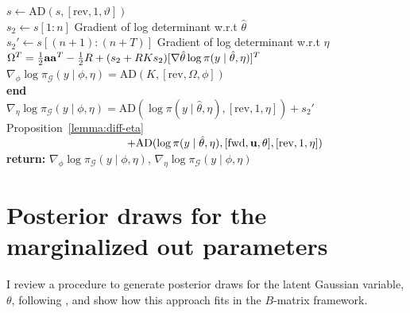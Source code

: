 \documentclass[stslayout, noinfoline]{imsart}
\theoremstyle{definition}
\begin{document}
\begin{algorithm}
{    }
    $s \gets \text{AD}(s, [\text{rev}, 1, \vartheta])$  \\
    $s_2 \gets s[1:n]$ \Comment Gradient of log determinant w.r.t $\hat \theta$ \\
    $s_2' \gets s[(n + 1):(n + T)]$ \Comment Gradient of log determinant w.r.t $\eta$ \\
    $\Omega^T = \frac{1}{2} {\bf a a}^T - \frac{1}{2} R + (s_2 + RKs_2)[\nabla{\hat \theta} \log \pi(y \mid \hat \theta, \eta)]^T$ \Comment \citep[3.2]{Margossian:2020-laplace}  \\
    $\nabla_\phi \log \pi_\mathcal{G} (y \mid \phi, \eta) = \text{AD}(K, [\text{rev}, \Omega, \phi])$ \\
    {\bf end} \\
    $\nabla_\eta \log \pi_\mathcal{G}(y \mid \phi, \eta) = \text{AD}(\log \pi(y \mid \hat \theta, \eta), [\text{rev}, 1, \eta]) + s_2'$ \Comment Proposition~\ref{lemma:diff-eta} \\
    $ \hspace{1.5in}  + \text{AD}(\log \pi(y \mid \hat \theta, \eta), [\text{fwd}, \mathbf u, \theta], [\text{rev}, 1, \eta])$ \\
    \textbf{return:}  $\nabla_\phi \log \pi_\mathcal{G} (y \mid \phi, \eta)$, $\nabla_\eta \log \pi_\mathcal{G}(y \mid \phi, \eta)$
\end{algorithm}

\section{Posterior draws for the marginalized out parameters}

I review a procedure to generate posterior draws for the latent Gaussian variable, $\theta$,
following \citet{Rasmussen:2006}, and show how this approach fits in the $B$-matrix framework.
\end{document}
